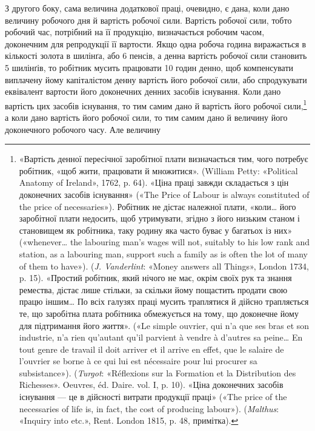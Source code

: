 З другого боку, сама величина додаткової праці, очевидно,
є дана, коли дано величину робочого дня й вартість робочої
сили. Вартість робочої сили, тобто робочий час, потрібний на її
продукцію, визначається робочим часом, доконечним для репродукції
її вартости. Якщо одна робоча година виражається в
кількості золота в  шилінґа, або 6 пенсів, а денна вартість робочої
сили становить 5 шилінґів, то робітник мусить працювати
10 годин денно, щоб компенсувати виплачену йому капіталістом
денну вартість його робочої сили, або спродукувати еквівалент
вартости його доконечних денних засобів існування. Коли дано
вартість цих засобів існування, то тим самим дано й вартість його
робочої сили,\footnote{
«Вартість денної пересічної заробітної плати визначається тим,
чого потребує робітник, «щоб жити, працювати й множитися». (William
Petty: «Political Anatomy of Ireland», 1762, p. 64). «Ціна праці
завжди складається з цін доконечних засобів існування» («The Price of
Labour is always constituted of the price of necessaries»). Робітник не дістає
належної плати, «коли\dots{} його заробітної плати недосить, щоб утримувати,
згідно з його низьким станом і становищем як робітника, таку родину
яка часто буває у багатьох із них» («whenever\dots{} the labouring man’s
wages will not, suitably to his low rank and station, as a labouring man,
support such a family as is often the lot of many of them to have»).
(\emph{J. Vanderlint}: «Money answers all Things», London 1734, p. 15). «Простий
робітник, який нічого не має, окрім своїх рук та знання ремества, дістає
лише стільки, за скільки йому пощастить продати свою працю іншим\dots{}
По всіх галузях праці мусить траплятися й дійсно трапляється те, що
заробітна плата робітника обмежується на тому, що доконечне йому
для підтримання його життя». («Le simple ouvrier, qui n’a que ses bras
et son industrie, n’a rien qu’autant qu’il parvient à vendre à d’autres sa
peine\dots{} En tout genre de travail il doit arriver et il arrive en effet, que le
salaire de l’ouvrier se borne à ce qui lui est nécessaire pour lui procurer
sa subsistance»). (\emph{Turgot}: «Réflexions sur la Formation et la Distribution
des Richesses». Oeuvres, éd. Daire. vol. I, p. 10). «Ціна доконечних
засобів існування — це в дійсності витрати продукції праці» («The
price of the necessaries of life is, in fact, the cost of producing labour»).
(\emph{Malthus}: «Inquiry into etc.», Rent. London 1815, p. 48, примітка).
} а коли дано вартість його робочої сили, то тим
самим дано й величину його доконечного робочого часу. Але величину
